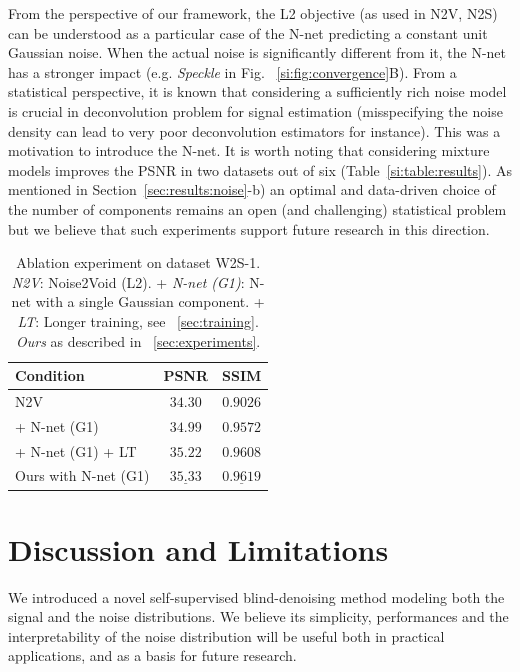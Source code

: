 \documentclass[lettersize,journal]{IEEEtran}
\begin{document}
From the perspective of our framework, the L2 objective (as used in N2V, N2S) can be understood as a particular case of the N-net predicting a constant unit Gaussian noise. When the actual noise is significantly different from it, the N-net has a stronger impact (e.g. \textit{Speckle} in Fig. ~\ref{si:fig:convergence}B).
From a statistical perspective, it is known that considering a sufficiently rich noise model is crucial in deconvolution problem for signal estimation (misspecifying the noise density can lead to very poor deconvolution estimators for instance). This was a motivation to introduce the N-net.
It is worth noting that considering mixture models improves the PSNR in two datasets out of six (Table~\ref{si:table:results}).
As mentioned in Section~\ref{sec:results:noise}-b) an optimal and data-driven choice of the number of components remains an open (and challenging) statistical problem but we believe that such experiments support future research in this direction.

\begin{table}[ht]
\caption{Ablation experiment on dataset W2S-1.
\textit{N2V}: Noise2Void (L2).
+ \textit{N-net (G1)}: N-net with a single Gaussian component.
+ \textit{LT}: Longer training, see ~\ref{sec:training}.
\textit{Ours} as described in ~\ref{sec:experiments}.
}
\label{table:ablation}
\begin{center}
\begin{small}
\begin{sc}
\begin{tabular}{lcc}
\toprule
Condition & PSNR & SSIM \\
\midrule
N2V & $34.30$ & $0.9026$\\
 + N-net (G1) & $34.99$ & $0.9572$\\
 + N-net (G1) + LT & $35.22$ & $0.9608$\\
Ours with N-net (G1)& $\underline{35.33}$ & $\underline{0.9619}$\\
\bottomrule
\end{tabular}
\end{sc}
\end{small}
\end{center}
\end{table}

\section{Discussion and Limitations}
\label{sec:discussion}
We introduced a novel self-supervised blind-denoising method modeling both the signal and the noise distributions. We believe its simplicity, performances and the interpretability of the noise distribution will be useful both in practical applications, and as a basis for future research.
\end{document}
